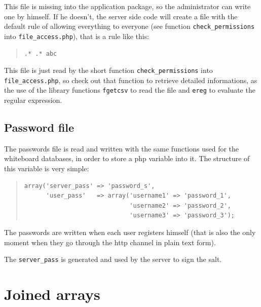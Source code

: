 \documentclass[10pt,a4paper,english]{book}
\begin{document}
This file is missing into the application package, so the
administrator can write one by himself. If he doesn't, the server side
code will create a file with the default rule of allowing everything
to everyone (see function \texttt{check{\_}permissions} into
\texttt{file{\_}access.php}), that is a rule like this:
\begin{quote}\begin{verbatim}
.* .* abc
\end{verbatim}
\end{quote}

This file is just read by the short function \texttt{check{\_}permissions}
into \texttt{file{\_}access.php}, so check out that function to retrieve
detailed informations, as the use of the library functions \texttt{fgetcsv}
to read the file and \texttt{ereg} to evaluate the regular expression.



\hypertarget{password-file}{}
\subsection{Password file}
\label{password-file}

The passwords file is read and written with the same functions used
for the whiteboard databases, in order to store a php variable into
it. The structure of this variable is very simple:
\begin{quote}\begin{verbatim}
array('server_pass' => 'password_s',
      'user_pass'   => array('username1' => 'password_1',
                             'username2' => 'password_2',
                             'username3' => 'password_3');
\end{verbatim}
\end{quote}

The passwords are written when each user registers himself (that is
also the only moment when they go through the http channel in plain
text form).

The \texttt{server{\_}pass} is generated and used by the server to sign the
salt.



\hypertarget{joined-arrays}{}
\section{Joined arrays}
\label{joined-arrays}
\end{document}
